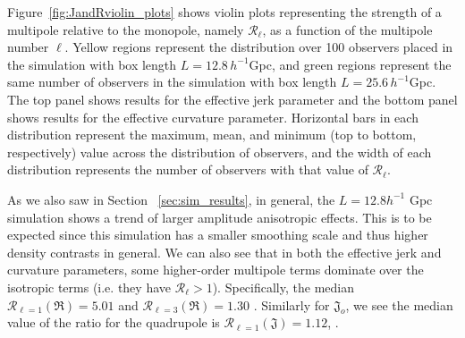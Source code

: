 \documentclass[fleqn,usenatbib]{mnras}
\begin{document}
{Figure~\ref{fig:JandRviolin_plots} shows violin plots representing the strength of a multipole relative to the monopole, namely $\mathcal{R}_\ell$, as a function of the multipole number $\ell$. Yellow regions represent the distribution over 100 observers placed in the simulation with box length $L=12.8\,h^{-1}$Gpc, and green regions represent the same number of observers in the simulation with box length $L=25.6\,h^{-1}$Gpc. The top panel shows results for the effective jerk parameter and the bottom panel shows results for the effective curvature parameter. Horizontal bars in each distribution represent the maximum, mean, and minimum (top to bottom, respectively) value across the distribution of observers, and the width of each distribution represents the number of observers with that value of $\mathcal{R}_\ell$. }

As we also saw in Section~ \ref{sec:sim_results}, in general, the $L=12.8 h^{-1}$ Gpc simulation shows a trend of larger {amplitude} anisotropic effects. This is to be expected since this simulation has a smaller smoothing scale and thus higher density contrasts in general. We can also see that in both the {effective} jerk and curvature {parameters}, some higher-order {multipole} terms dominate over the isotropic terms {(i.e. they have $\mathcal{R}_{\ell} > 1$)}. {Specifically, {the median} 
${\mathcal{R}_{\ell=1}(\mathfrak{R}) =5.01}$ and ${\mathcal{R}_{\ell=3}(\mathfrak{R}) =1.30}$
.}
Similarly for $\mathfrak{J}_o$, we see the {median value of the ratio for the quadrupole is {$\mathcal{R}_{\ell=1}(\mathfrak{J}) = 1.12$,
.} }
\end{document}
